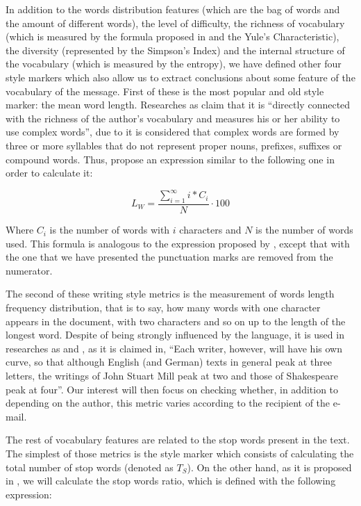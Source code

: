 In addition to the words distribution features (which are the bag of words and the amount of different words), the level of difficulty, the richness of vocabulary (which is measured by the formula proposed in \cite{honore1979some} and the Yule's Characteristic), the diversity (represented by the Simpson's Index) and the internal structure of the vocabulary (which is measured by the entropy), we have defined other four style markers which also allow us to extract conclusions about some feature of the vocabulary of the message. First of these is the most popular and old style marker: the mean word length. Researches as \cite{ril2014determination} claim that it is ``directly connected with the richness of the author's vocabulary and measures his or her ability to use complex words'', due to it is considered that complex words are formed by three or more syllables that do not represent proper nouns, prefixes, suffixes or compound words. Thus, \cite{ril2014determination} propose an expression similar to the following one in order to calculate it:

$$
L_W = \frac{\sum_{i=1}^{\infty}i*C_i}{N}\cdot 100
$$

Where $C_i$ is the number of words with $i$ characters and $N$ is the number of words used. This formula is analogous to the expression proposed by \cite{ril2014determination}, except that with the one that we have presented the punctuation marks are removed from the numerator.

The second of these writing style metrics is the measurement of words length frequency distribution, that is to say, how many words with one character appears in the document, with two characters and so on up to the length of the longest word. Despite of being strongly influenced by the language, it is used in researches as \cite{corney2001identifying} and \cite{kemp1976personal}, as it is claimed in\cite{allen1974methods}, ``Each writer, however, will have his own curve, so that although English (and German) texts in general peak at three letters, the writings of John Stuart Mill peak at two and those of Shakespeare peak at four''. Our interest will then focus on checking whether, in addition to depending on the author, this metric varies according to the recipient of the e-mail.

The rest of vocabulary features are related to the stop words present in the text. The simplest of those metrics is the style marker which consists of calculating the total number of stop words (denoted as $T_S$). On the other hand, as it is proposed in \cite{ril2014determination},  we will calculate the stop words ratio, which is defined with the following expression:

